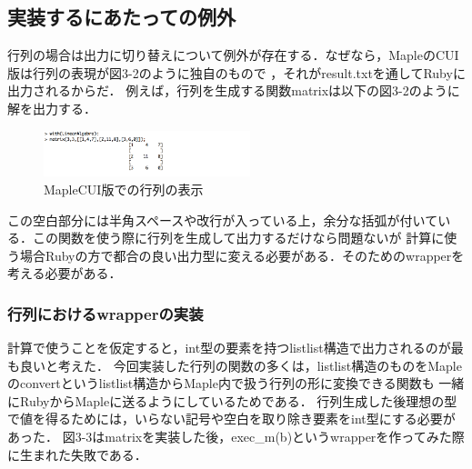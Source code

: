\subsection{実装するにあたっての例外}
行列の場合は出力に切り替えについて例外が存在する．なぜなら，MapleのCUI版は行列の表現が図3-2のように独自のもので
，それがresult.txtを通してRubyに出力されるからだ．
例えば，行列を生成する関数matrixは以下の図3-2のように解を出力する．

\begin{figure}[htbp]\begin{center}
\includegraphics[width=6cm,bb=0 0 442 500]{../figs/./mapleruby_eringi.004.png}
\caption{MapleCUI版での行列の表示}
\label{default}\end{center}\end{figure}
この空白部分には半角スペースや改行が入っている上，余分な括弧が付いている．この関数を使う際に行列を生成して出力するだけなら問題ないが
計算に使う場合Rubyの方で都合の良い出力型に変える必要がある．そのためのwrapperを考える必要がある．

\subsubsection{行列におけるwrapperの実装}
計算で使うことを仮定すると，int型の要素を持つlistlist構造で出力されるのが最も良いと考えた．
今回実装した行列の関数の多くは，listlist構造のものをMapleのconvertというlistlist構造からMaple内で扱う行列の形に変換できる関数も
一緒にRubyからMapleに送るようにしているためである．
行列生成した後理想の型で値を得るためには，いらない記号や空白を取り除き要素をint型にする必要があった．
図3-3はmatrixを実装した後，exec\_m(b)というwrapperを作ってみた際に生まれた失敗である．

